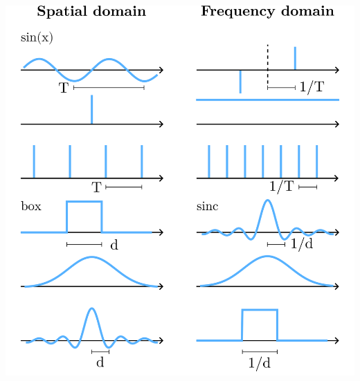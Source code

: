 \documentclass[a4paper,10pt]{article}
\begin{document}
\begin{center}
    \includegraphics[width=\linewidth]{fourier-transforms.png}
\end{center}
\end{document}
